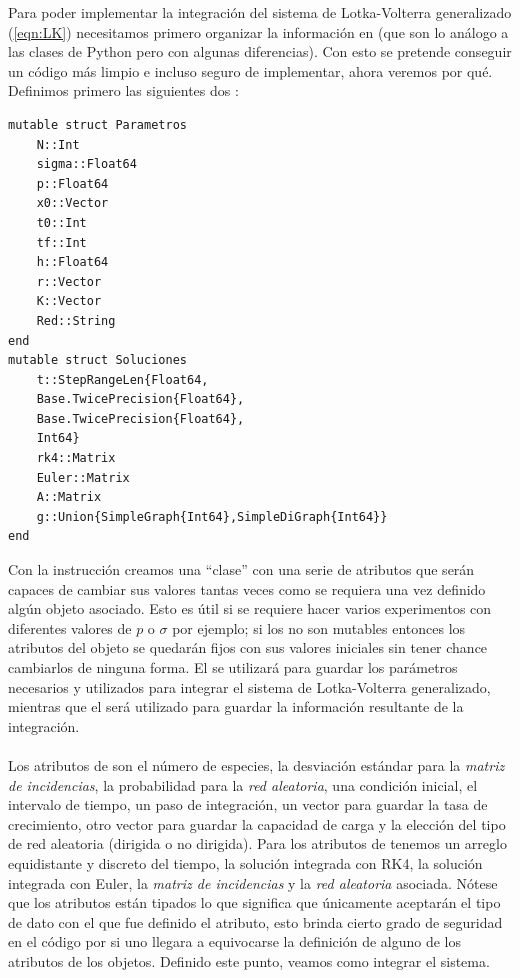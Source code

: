 Para poder implementar la integración del sistema de Lotka-Volterra generalizado (\ref{eqn:LK}) necesitamos primero organizar la información en  (que son lo análogo a las clases de Python pero con algunas diferencias). Con esto se pretende conseguir un código más limpio e incluso seguro de implementar, ahora veremos por qué. Definimos primero las siguientes dos :
\begin{verbatim}
mutable struct Parametros
	N::Int          
	sigma::Float64
	p::Float64
	x0::Vector
	t0::Int
	tf::Int
	h::Float64
	r::Vector
	K::Vector 
	Red::String
end
mutable struct Soluciones
	t::StepRangeLen{Float64,
	Base.TwicePrecision{Float64},
	Base.TwicePrecision{Float64}, 
	Int64}
	rk4::Matrix
	Euler::Matrix
	A::Matrix
	g::Union{SimpleGraph{Int64},SimpleDiGraph{Int64}}
end
\end{verbatim}
Con la instrucción  creamos una ``clase'' con una serie de atributos que serán capaces de cambiar sus valores tantas veces como se requiera una vez definido algún objeto asociado. Esto es útil si se requiere hacer varios experimentos con diferentes valores de $p$ o $\sigma$ por ejemplo; si los  no son mutables entonces los atributos del objeto se quedarán fijos con sus valores iniciales sin tener chance cambiarlos de ninguna forma. El  se utilizará para guardar los parámetros necesarios y utilizados para integrar el sistema de Lotka-Volterra generalizado, mientras que el  será utilizado para guardar la información resultante de la integración.\\
\\
Los atributos de  son el número de especies, la desviación estándar para la \textit{matriz de incidencias}, la probabilidad para la \textit{red aleatoria}, una condición inicial, el intervalo de tiempo, un paso de integración, un vector para guardar la tasa de crecimiento, otro vector para guardar la capacidad de carga y la elección del tipo de red aleatoria (dirigida o no dirigida). Para los atributos de  tenemos un arreglo equidistante y discreto del tiempo, la solución integrada con RK4, la solución integrada con Euler, la \textit{matriz de incidencias} y la \textit{red aleatoria} asociada. Nótese que los atributos están tipados lo que significa que únicamente aceptarán el tipo de dato con el que fue definido el atributo, esto brinda cierto grado de seguridad en el código por si uno llegara a equivocarse la definición de alguno de los atributos de los objetos. Definido este punto, veamos como integrar el sistema. 
